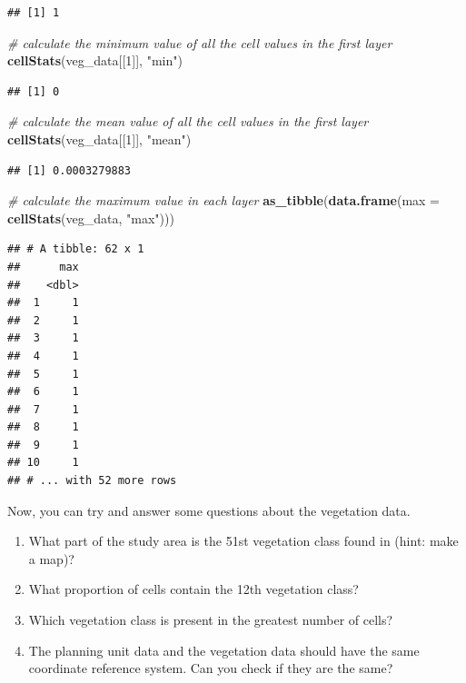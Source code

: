 \documentclass[12pt,]{book}
\newenvironment{Shaded}{\begin{snugshade}}{\end{snugshade}}
\newcommand{\KeywordTok}[1]{\textcolor[rgb]{0.13,0.29,0.53}{\textbf{#1}}}
\newcommand{\DataTypeTok}[1]{\textcolor[rgb]{0.13,0.29,0.53}{#1}}
\newcommand{\DecValTok}[1]{\textcolor[rgb]{0.00,0.00,0.81}{#1}}
\newcommand{\StringTok}[1]{\textcolor[rgb]{0.31,0.60,0.02}{#1}}
\newcommand{\CommentTok}[1]{\textcolor[rgb]{0.56,0.35,0.01}{\textit{#1}}}
\newcommand{\NormalTok}[1]{#1}
\providecommand{\tightlist}{%
  \setlength{\itemsep}{0pt}\setlength{\parskip}{0pt}}
\let\BeginKnitrBlock\begin \let\EndKnitrBlock\end
\begin{document}
\begin{verbatim}
## [1] 1
\end{verbatim}

\begin{Shaded}
\begin{Highlighting}[]
\CommentTok{# calculate the minimum value of all the cell values in the first layer}
\KeywordTok{cellStats}\NormalTok{(veg_data[[}\DecValTok{1}\NormalTok{]], }\StringTok{"min"}\NormalTok{)}
\end{Highlighting}
\end{Shaded}

\begin{verbatim}
## [1] 0
\end{verbatim}

\begin{Shaded}
\begin{Highlighting}[]
\CommentTok{# calculate the mean value of all the cell values in the first layer}
\KeywordTok{cellStats}\NormalTok{(veg_data[[}\DecValTok{1}\NormalTok{]], }\StringTok{"mean"}\NormalTok{)}
\end{Highlighting}
\end{Shaded}

\begin{verbatim}
## [1] 0.0003279883
\end{verbatim}

\clearpage

\begin{Shaded}
\begin{Highlighting}[]
\CommentTok{# calculate the maximum value in each layer}
\KeywordTok{as_tibble}\NormalTok{(}\KeywordTok{data.frame}\NormalTok{(}\DataTypeTok{max =} \KeywordTok{cellStats}\NormalTok{(veg_data, }\StringTok{"max"}\NormalTok{)))}
\end{Highlighting}
\end{Shaded}

\begin{verbatim}
## # A tibble: 62 x 1
##      max
##    <dbl>
##  1     1
##  2     1
##  3     1
##  4     1
##  5     1
##  6     1
##  7     1
##  8     1
##  9     1
## 10     1
## # ... with 52 more rows
\end{verbatim}

Now, you can try and answer some questions about the vegetation data.

\BeginKnitrBlock{rmdquestion}
\begin{enumerate}
\def\labelenumi{\arabic{enumi}.}
\tightlist
\item
  What part of the study area is the 51st vegetation class found in
  (hint: make a map)?
\item
  What proportion of cells contain the 12th vegetation class?
\item
  Which vegetation class is present in the greatest number of cells?
\item
  The planning unit data and the vegetation data should have the same
  coordinate reference system. Can you check if they are the same?
\end{enumerate}
\EndKnitrBlock{rmdquestion}
\end{document}
